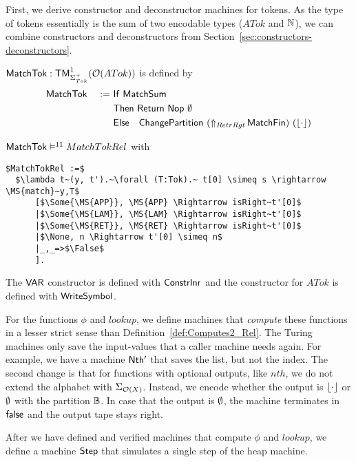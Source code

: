 First, we derive constructor and deconstructor machines for tokens.  As the type of tokens essentially is the sum of two encodable types ($ATok$ and
$\Nat$), we can combine constructors and deconstructors from Section~\ref{sec:constructors-deconstructors}.
%
\begin{definition}[$\MS{MatchTok}$][MatchTok]
  $\MS{MatchTok} : \TM_{\Sigma^+_{Tok}}^1(\Option(ATok))$ is defined by
  \begin{alignat*}{2}
    & \MS{MatchTok} &~:=~& \MS{If}~\MS{MatchSum} \\
    &               &    & \MS{Then}~   \Return{\Nop}{\None} \\
    &               &    & \MS{Else}~~~ \MS{ChangePartition}~(\LiftAlphabet{\MS{MatchFin}}{RetrRgt})~(\Some\cdot)
  \end{alignat*}
\end{definition}
\begin{lemma}
  \label{lem:MatchTok_Sem}
  $\MS{MatchTok} \RealiseIn{11} MatchTokRel$ with
\begin{lstlisting}[style=semicoqstyle]
$MatchTokRel :=$
  $\lambda t~(y, t').~\forall (T:Tok).~ t[0] \simeq s \rightarrow \MS{match}~y,T$
      [$\Some{\MS{APP}}, \MS{APP} \Rightarrow isRight~t'[0]$
      |$\Some{\MS{LAM}}, \MS{LAM} \Rightarrow isRight~t'[0]$
      |$\Some{\MS{RET}}, \MS{RET} \Rightarrow isRight~t'[0]$
      |$\None, n \Rightarrow t'[0] \simeq n$
      |_,_=>$\False$
      ].
\end{lstlisting}
\end{lemma}
The $\MS{VAR}$ constructor is defined with $\MS{ConstrInr}$ and the constructor for $ATok$ is defined with $\MS{WriteSymbol}$.

For the functions $\phi$ and $lookup$, we define machines that \textit{compute} these functions in a lesser strict sense than
Definition~\ref{def:Computes2_Rel}.  The Turing machines only save the input-values that a caller machine needs again.  For example, we have a machine
$\MS{Nth'}$ that saves the list, but not the index.  The second change is that for functions with optional outputs, like $nth$, we do not extend the
alphabet with $\Sigma_{\Option(X)}$.  Instead, we encode whether the output is $\Some{\cdot}$ or $\None$ with the partition $\Bool$.  In case that the
output is $\None$, the machine terminates in $\false$ and the output tape stays right.

After we have defined and verified machines that compute $\phi$ and $lookup$, we define a machine $\MS{Step}$ that simulates a single step of the heap
machine.


